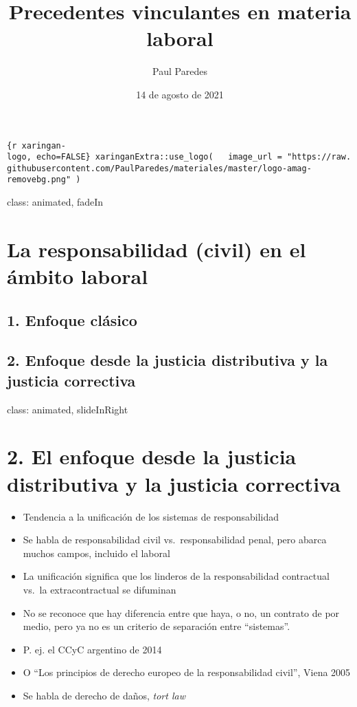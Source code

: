 \documentclass[
]{article}
\title{Precedentes vinculantes en materia laboral}
\author{Paul Paredes}
\date{14 de agosto de 2021}
\begin{document}
\maketitle

\texttt{\{r\ xaringan-logo,\ echo=FALSE\}\ xaringanExtra::use\_logo(\ \ \ image\_url\ =\ "https://raw.githubusercontent.com/PaulParedes/materiales/master/logo-amag-removebg.png"\ )}

class: animated, fadeIn

\section{La responsabilidad (civil) en el ámbito laboral}

\subsection{1. Enfoque clásico}

\subsection{2. Enfoque desde la justicia distributiva y la justicia
correctiva}

class: animated, slideInRight

\section{2. El enfoque desde la justicia distributiva y la justicia
correctiva}

\begin{itemize}
\item
  Tendencia a la unificación de los sistemas de responsabilidad
\item
  Se habla de responsabilidad civil vs.~responsabilidad penal, pero
  abarca muchos campos, incluido el laboral
\item
  La unificación significa que los linderos de la responsabilidad
  contractual vs.~la extracontractual se difuminan
\item
  No se reconoce que hay diferencia entre que haya, o no, un contrato de
  por medio, pero ya no es un criterio de separación entre ``sistemas''.
\item
  P. ej. el CCyC argentino de 2014
\item
  O ``Los principios de derecho europeo de la responsabilidad civil'',
  Viena 2005
\item
  Se habla de derecho de daños, \emph{tort law}
\end{itemize}
\end{document}
